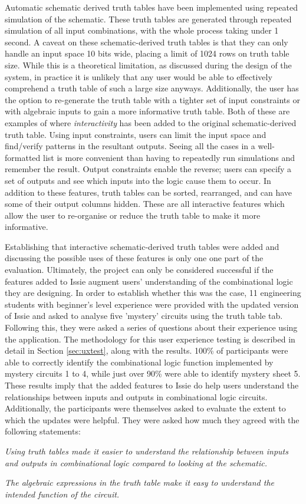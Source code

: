 Automatic schematic derived truth tables have been implemented using repeated simulation of the schematic. These truth tables are generated through repeated simulation of all input combinations, with the whole process taking under 1 second. A caveat on these schematic-derived truth tables is that they can only handle an input space 10 bits wide, placing a limit of 1024 rows on truth table size. While this is a theoretical limitation, as discussed during the design of the system, in practice it is unlikely that any user would be able to effectively comprehend a truth table of such a large size anyways. Additionally, the user has the option to re-generate the truth table with a tighter set of input constraints or with algebraic inputs to gain a more informative truth table. Both of these are examples of where \textit{interactivity} has been added to the original schematic-derived truth table. Using input constraints, users can limit the input space and find/verify patterns in the resultant outputs. Seeing all the cases in a well-formatted list is more convenient than having to repeatedly run simulations and remember the result. Output constraints enable the reverse; users can specify a set of outputs and see which inputs into the logic cause them to occur. In addition to these features, truth tables can be sorted, rearranged, and can have some of their output columns hidden. These are all interactive features which allow the user to re-organise or reduce the truth table to make it more informative.

Establishing that interactive schematic-derived truth tables were added and discussing the possible uses of these features is only one one part of the evaluation. Ultimately, the project can only be considered successful if the features added to Issie augment users' understanding of the combinational logic they are designing. In order to establish whether this was the case, 11 engineering students with beginner's level experience were provided with the updated version of Issie and asked to analyse five 'mystery' circuits using the truth table tab. Following this, they were asked a series of questions about their experience using the application. The methodology for this user experience testing is described in detail in Section \ref{sec:uxtest}, along with the results. 100\% of participants were able to correctly identify the combinational logic function implemented by mystery circuits 1 to 4, while just over 90\% were able to identify mystery sheet 5. These results imply that the added features to Issie do help users understand the relationships between inputs and outputs in combinational logic circuits. Additionally, the participants were themselves asked to evaluate the extent to which the updates were helpful. They were asked how much they agreed with the following statements:
\begin{center}
    \textit{Using truth tables made it easier to understand the relationship between inputs and outputs in combinational logic compared to looking at the schematic.} 
    
    \textit{The algebraic expressions in the truth table make it easy to understand the intended function of the circuit.}
\end{center}

